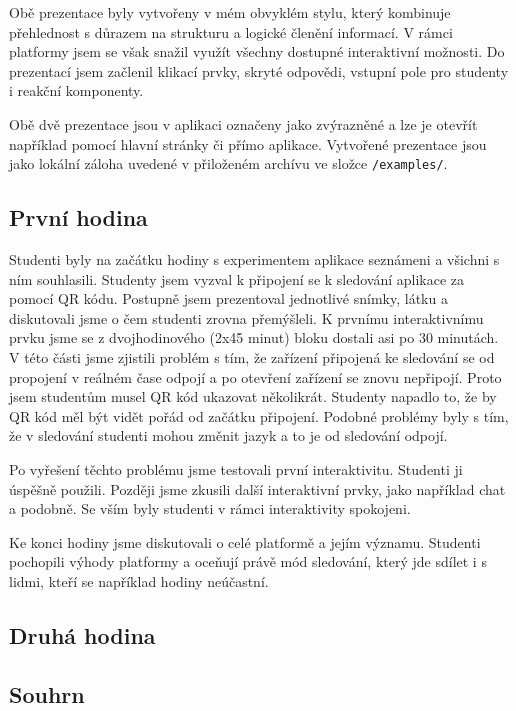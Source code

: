 Obě prezentace byly vytvořeny v mém obvyklém stylu, který kombinuje přehlednost s důrazem na strukturu a logické členění informací.
V rámci platformy jsem se však snažil využít všechny dostupné interaktivní možnosti.
Do prezentací jsem začlenil klikací prvky, skryté odpovědi, vstupní pole pro studenty i reakční komponenty.

Obě dvě prezentace jsou v aplikaci označeny jako zvýrazněné a lze je otevřít například pomocí hlavní stránky či přímo aplikace.
Vytvořené prezentace jsou jako lokální záloha uvedené v přiloženém archívu ve složce \verb|/examples/|.

\subsection{První hodina}

Studenti byly na začátku hodiny s experimentem aplikace seznámeni a všichni s ním souhlasili.
Studenty jsem vyzval k připojení se k sledování aplikace za pomocí QR kódu.
Postupně jsem prezentoval jednotlivé snímky, látku a diskutovali jsme o čem studenti zrovna přemýšleli.
K prvnímu interaktivnímu prvku jsme se z dvojhodinového (2x45 minut) bloku dostali asi po 30 minutách.
V této části jsme zjistili problém s tím, že zařízení připojená ke sledování se od propojení v reálném čase odpojí a po otevření zařízení se znovu nepřipojí.
Proto jsem studentům musel QR kód ukazovat několikrát.
Studenty napadlo to, že by QR kód měl být vidět pořád od začátku připojení.
Podobné problémy byly s tím, že v sledování studenti mohou změnit jazyk a to je od sledování odpojí.

Po vyřešení těchto problému jsme testovali první interaktivitu.
Studenti ji úspěšně použili.
Později jsme zkusili další interaktivní prvky, jako například chat a podobně.
Se vším byly studenti v rámci interaktivity spokojeni.

Ke konci hodiny jsme diskutovali o celé platformě a jejím významu.
Studenti pochopili výhody platformy a oceňují právě mód sledování, který jde sdílet i s lidmi, kteří se například hodiny neúčastní.

\subsection{Druhá hodina}

\subsection{Souhrn}


